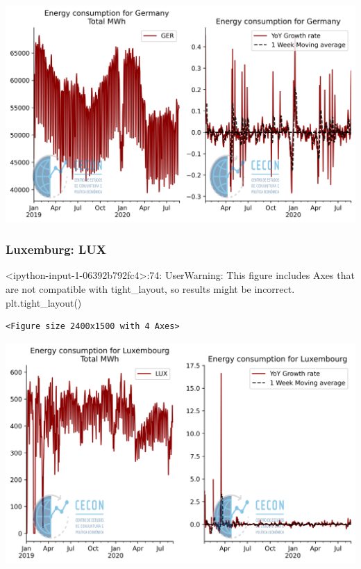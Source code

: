 \documentclass[11pt]{article}
\begin{document}
\begin{center}
\includegraphics[width=.9\linewidth]{obipy-resources/62e383af79e91b63c7fc98dd7fb55b3c3ececcb9/94b114813ade8f5d4312e2e75f5b997a956c4a44.png}
\end{center}

\subsubsection{Luxemburg: LUX}
\label{sec:org1d0a876}

<ipython-input-1-06392b792fc4>:74: UserWarning: This figure includes Axes that are not compatible with tight\_layout, so results might be incorrect.
  plt.tight\_layout()

\begin{verbatim}
<Figure size 2400x1500 with 4 Axes>
\end{verbatim}


\begin{center}
\includegraphics[width=.9\linewidth]{obipy-resources/62e383af79e91b63c7fc98dd7fb55b3c3ececcb9/9106e308f42f1f76c029539778f3952a7f562f15.png}
\end{center}
\end{document}

